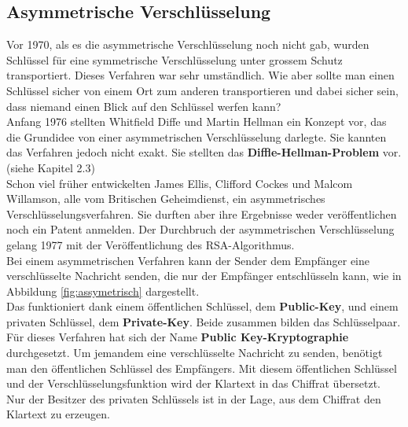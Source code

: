 \subsection{Asymmetrische Verschlüsselung}
Vor 1970, als es die asymmetrische Verschlüsselung noch nicht gab, wurden Schlüssel für eine symmetrische Verschlüsselung unter grossem Schutz transportiert.
%
Dieses Verfahren war sehr umständlich. %
Wie aber sollte man einen Schlüssel sicher von einem Ort zum anderen transportieren und dabei sicher sein, dass niemand einen Blick auf den Schlüssel werfen kann?\\
%
Anfang 1976 stellten Whitfield Diffe und Martin Hellman ein Konzept vor, das die Grundidee von einer asymmetrischen Verschlüsselung darlegte. Sie kannten das Verfahren jedoch nicht exakt. Sie stellten das \textbf{Diffle-Hellman-Problem} vor. (siehe \cite{rsa_and_public_key} Kapitel 2.3)\\ %
Schon viel früher entwickelten James Ellis, Clifford Cockes und Malcom Willamson, alle vom Britischen Geheimdienst, ein asymmetrisches Verschlüsselungsverfahren. Sie durften aber ihre Ergebnisse weder veröffentlichen noch ein Patent anmelden. 
Der Durchbruch der asymmetrischen Verschlüsselung gelang 1977 mit der Veröffentlichung des RSA-Algorithmus. \\[2ex]
%
Bei einem asymmetrischen Verfahren kann der Sender dem Empfänger eine verschlüsselte Nachricht senden, die nur der Empfänger entschlüsseln kann, wie in Abbildung \ref{fig:assymetrisch} dargestellt.\\
%
Das funktioniert dank einem öffentlichen Schlüssel, dem \textbf{Public-Key}, und einem privaten Schlüssel, dem \textbf{Private-Key}. Beide zusammen bilden das Schlüsselpaar.\\
Für dieses Verfahren hat sich der Name \textbf{Public Key-Kryptographie} durchgesetzt.
%
%
Um jemandem eine verschlüsselte Nachricht zu senden, benötigt man den öffentlichen Schlüssel des Empfängers. Mit diesem öffentlichen Schlüssel und der Verschlüsselungsfunktion wird der Klartext in das Chiffrat übersetzt. Nur der Besitzer des privaten Schlüssels ist in der Lage, aus dem Chiffrat den Klartext zu erzeugen.\\
